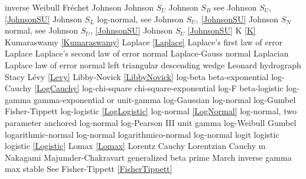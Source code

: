 inverse Weibull 				\dotfill	Fr\'{e}chet  						\ncite	%
%
Johnson							\dotfill	Johnson $S_U$						\ncite
Johnson $S_B$					\dotfill	see Johnson $S_U$, \eqref{JohnsonSU}\ncite
Johnson $S_L$					\dotfill	log-normal, see Johnson $S_U$, \eqref{JohnsonSU}		\ncite
Johnson $S_N$					\dotfill	normal, see Johnson $S_U$, \eqref{JohnsonSU}			\ncite
Johnson $S_U$					\dotfill	\eqref{JohnsonSU}					\ncite
%
K								\dotfill	\eqref{K}							\ncite	%
Kumaraswamy						\dotfill	\eqref{Kumaraswamy} 				\ncite	%
%
Laplace							\dotfill	\eqref{Laplace} 					\ncite	%
Laplace's first law of error	\dotfill	Laplace 							\ncite	%
Laplace's second law of error  	\dotfill	normal 								\ncite	%
Laplace-Gauss					\dotfill	normal 								\ncite	%
Laplacian  						\dotfill	Laplace								\ncite 	%
law of error					\dotfill	normal 								\ncite	%
left triangular					\dotfill	descending wedge					\ncite	%
Leonard hydrograph				\dotfill	Stacy 								\ncite	%
L\'{e}vy 						\dotfill	\eqref{Levy}						\ncite	%
Libby-Novick					\dotfill	\eqref{LibbyNovick}					\ncite	
log-beta						\dotfill	beta-exponential					 	%
log-Cauchy						\dotfill	\eqref{LogCauchy}					\ncite
log-chi-square					\dotfill	chi-square-exponential				\ncite	%
log-F							\dotfill	beta-logistic						\ncite	%
log-gamma 						\dotfill	gamma-exponential or unit-gamma		\ncite	%
log-Gaussian					\dotfill	log-normal							\ncite	%
log-Gumbel						\dotfill	Fisher-Tippett						\ncite	%
log-logistic					\dotfill	\eqref{LogLogistic}  				\ncite	%
log-normal						\dotfill	\eqref{LogNormal}					\ncite	%
log-normal, two parameter		\dotfill	anchored log-normal					\ncite	%
log-Pearson III					\dotfill	unit gamma							\ncite
log-Weibull 					\dotfill	Gumbel 								\ncite	%
logarithmic-normal				\dotfill	log-normal 							\ncite	%
logarithmico-normal				\dotfill	log-normal 							\ncite	%
logit							\dotfill	logistic 							\ncite	%
logistic 						\dotfill	\eqref{Logistic} 					\ncite	%
Lomax 							\dotfill	\eqref{Lomax}						\ncite	%
Lorentz  						\dotfill	Cauchy 								\ncite	%
Lorentzian  					\dotfill	Cauchy 								\ncite	%
%
m 								\dotfill	Nakagami 							 	%
Majumder-Chakravart				\dotfill	generalized beta prime				 %
March 							\dotfill	inverse gamma						\ncite	%
max stable						\dotfill	See Fisher-Tippett \eqref{FisherTippett}	\ncite
